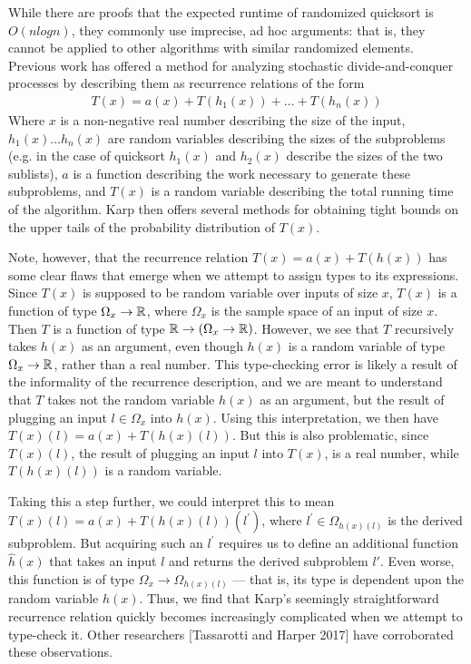 While there are proofs that the expected runtime of randomized quicksort is $O(nlogn)$, they commonly use
imprecise, ad hoc arguments: that is, they cannot be applied to other algorithms with similar randomized elements. 
Previous work has offered a method for analyzing stochastic divide-and-conquer processes by describing them as recurrence relations of the form
\begin{align*}
T(x) = a(x) + T(h_1(x)) + \dots + T(h_n(x))
\end{align*}
Where $x$ is a non-negative real number describing the size of the input, $h_1(x) \dots h_n(x)$ are random variables 
describing the sizes of the subproblems (e.g. in the case of quicksort $h_1(x)$ and $h_2(x)$ describe the sizes of the two 
sublists), $a$ is a function describing the work necessary to generate these subproblems, and $T(x)$ is a random variable 
describing the total running time of the algorithm. Karp then offers several methods for obtaining tight bounds on the upper tails 
of the probability distribution of $T(x)$. 

Note, however, that the recurrence relation $T(x) = a(x) + T(h(x))$ has some clear flaws that 
emerge when we attempt to assign types to its expressions. Since $T(x)$ is supposed to be random
variable over inputs of size $x$, $T(x)$ is a function of type 
$\Omega_x \rightarrow \mathbb{R}$, where $\Omega_x$ is the sample space of an input of size $x$. Then $T$ is a 
function of type $\mathbb{R} \rightarrow (\Omega_x \rightarrow \mathbb{R})$. However, we see that $T$ recursively takes 
$h(x)$ as an argument, even though $h(x)$ is a random variable of type $\Omega_x \rightarrow \mathbb{R}$, 
rather than a real number. This type-checking error is likely a result of the informality of the recurrence description, 
and we are meant to understand that $T$ takes not the 
random variable $h(x)$ as an argument, but the result of plugging an input $l \in \Omega_x$ into $h(x)$. Using this 
interpretation, we then have $T(x)(l) = a(x) + T(h(x)(l))$. But this is also problematic, since $T(x)(l)$, the result 
of plugging an input $l$ into $T(x)$, is a real number, while $T(h(x)(l))$ is a random variable. 

Taking this a step further, we could interpret this to mean $T(x)(l) = a(x) + T(h(x)(l))(l^\prime)$, where $l^\prime \in 
\Omega_{h(x)(l)}$ is the derived subproblem. But acquiring such an $l^\prime$ requires us to define an 
additional function $\hat{h}(x)$ that takes an input $l$ and returns the derived subproblem $l'$. 
Even worse, this function is of type $\Omega_x \rightarrow \Omega_{h(x)(l)}$ --- that is, its type is dependent 
upon the random variable $h(x)$. Thus, we find that Karp's seemingly straightforward recurrence relation quickly becomes 
increasingly complicated when we attempt to type-check it. Other researchers [Tassarotti and Harper 2017] have corroborated 
these observations. 


